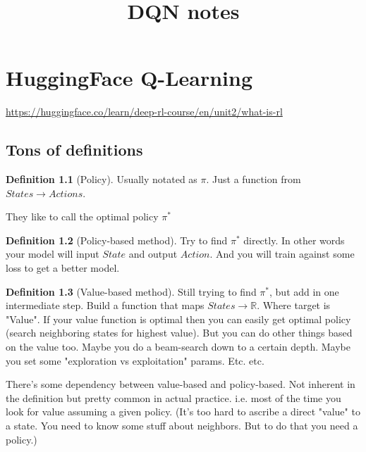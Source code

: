 \documentclass[11pt,notitlepage]{report}
\title{DQN notes}
\author{}
\date{}
\theoremstyle{definition}
\newtheorem{definition}{Definition}
\theoremstyle{plain}
\begin{document}
\maketitle

\tableofcontents

\chapter{HuggingFace Q-Learning}\label{chap:hface}
\url{https://huggingface.co/learn/deep-rl-course/en/unit2/what-is-rl}

\section{Tons of definitions}

\begin{definition}[Policy]\label{def:policy}
    Usually notated as $\pi$.
    Just a function from $States \to Actions$.

    They like to call the optimal policy $\pi^*$
\end{definition}
\begin{definition}[Policy-based method]\label{def:policy-based}
    Try to find $\pi^*$ directly.
    In other words your model will input $State$ and output $Action$.
    And you will train against some loss to get a better model.
\end{definition}
\begin{definition}[Value-based method]\label{def:value-based}
    Still trying to find $\pi^*$, but add in one intermediate step.
    Build a function that maps $States \to \mathbb{R}$. Where target is "Value".
    If your value function is optimal then you can easily get optimal policy (search neighboring states
    for highest value).
    But you can do other things based on the value too. Maybe you do a beam-search down to a certain depth.
    Maybe you set some "exploration vs exploitation" params. Etc. etc.
\end{definition}
There's some dependency between value-based and policy-based. Not inherent in the definition but pretty
common in actual practice. i.e. most of the time you look for value assuming a given policy.
(It's too hard to ascribe a direct "value" to a state. You need to know some stuff about neighbors.
But to do that you need a policy.)
\end{document}
